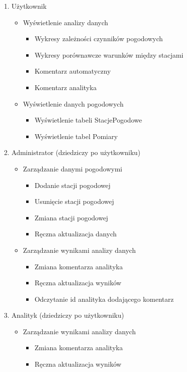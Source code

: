 \documentclass[12pt,a4paper]{article}
\begin{document}
 \newpage
\begin{small}
\begin{enumerate}
\item Użytkownik
    \begin{itemize}
    \item Wyświetlenie analizy danych
        \begin{itemize}
        \item Wykresy zależności czynników pogodowych
        \item Wykresy porównawcze warunków między stacjami
        \item Komentarz automatyczny
        \item Komentarz analityka
        \end{itemize}
    \item Wyświetlenie danych pogodowych
        \begin{itemize}
        \item Wyświetlenie tabeli StacjePogodowe
        \item Wyświetlenie tabel Pomiary
        \end{itemize}
    \end{itemize}
\item Administrator (dziedziczy po użytkowniku)
    \begin{itemize}
    \item Zarządzanie danymi pogodowymi
        \begin{itemize}
        \item Dodanie stacji pogodowej
        \item Usunięcie stacji pogodowej
        \item Zmiana stacji pogodowej
        \item Ręczna aktualizacja danych
        \end{itemize}
    \item Zarządzanie wynikami analizy danych
        \begin{itemize}
        \item Zmiana komentarza analityka
        \item Ręczna aktualizacja wyników
        \item Odczytanie id analityka dodającego komentarz
        \end{itemize}
    \end{itemize}
\item Analityk (dziedziczy po użytkowniku)
    \begin{itemize}
    \item Zarządzanie wynikami analizy danych
        \begin{itemize}
        \item Zmiana komentarza analityka
        \item Ręczna aktualizacja wyników
        \end{itemize}
    \end{itemize}
\end{enumerate}
\end{small}
\newpage
\end{document}
